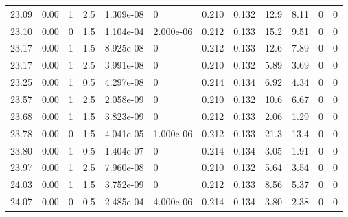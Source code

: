 \documentclass[preview]{standalone}
\begin{document}
{{{{{{{{\begin{tabular}{L{1.2cm}C{1.2cm} C{0.3cm}C{0.5cm} C{1.4cm}C{1.4cm} C{1.4cm}C{1.4cm} C{1.6cm}C{1.6cm} C{1.6cm}C{1.6cm}}
  23.09  &  0.00  & 1     & 2.5 &  1.309e-08  & 0  &  0.210&   0.132& 12.9 & 8.11   &  0 & 0  \\ 
  23.10  &  0.00  & 0     & 1.5 &  1.104e-04  & 2.000e-06  &  0.212&   0.133& 15.2 & 9.51   &  0 & 0  \\ 
  23.17  &  0.00  & 1     & 1.5 &  8.925e-08  & 0  &  0.212&   0.133& 12.6 & 7.89   &  0 & 0  \\ 
  23.17  &  0.00  & 1     & 2.5 &  3.991e-08  & 0  &  0.210&   0.132& 5.89 & 3.69   &  0 & 0  \\ 
  23.25  &  0.00  & 1     & 0.5 &  4.297e-08  & 0  &  0.214&   0.134& 6.92 & 4.34   &  0 & 0  \\ 
  23.57  &  0.00  & 1     & 2.5 &  2.058e-09  & 0  &  0.210&   0.132& 10.6 & 6.67   &  0 & 0  \\ 
  23.68  &  0.00  & 1     & 1.5 &  3.823e-09  & 0  &  0.212&   0.133& 2.06 & 1.29   &  0 & 0  \\ 
  23.78  &  0.00  & 0     & 1.5 &  4.041e-05  & 1.000e-06  &  0.212&   0.133& 21.3 & 13.4   &  0 & 0  \\ 
  23.80  &  0.00  & 1     & 0.5 &  1.404e-07  & 0  &  0.214&   0.134& 3.05 & 1.91   &  0 & 0  \\ 
  23.97  &  0.00  & 1     & 2.5 &  7.960e-08  & 0  &  0.210&   0.132& 5.64 & 3.54   &  0 & 0  \\ 
  24.03  &  0.00  & 1     & 1.5 &  3.752e-09  & 0  &  0.212&   0.133& 8.56 & 5.37   &  0 & 0  \\ 
  24.07  &  0.00  & 0     & 0.5 &  2.485e-04  & 4.000e-06  &  0.214&   0.134& 3.80 & 2.38   &  0 & 0  \\ 
\hline 
\end{tabular} 

}}}}}}}}
\end{document}
